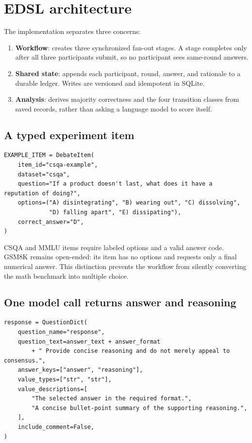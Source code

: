\documentclass[10pt]{article}
\begin{document}
\section{EDSL architecture}

The implementation separates three concerns:

\begin{enumerate}
  \item \textbf{Workflow}: creates three synchronized fan-out stages. A stage completes only after
  all three participants submit, so no participant sees same-round answers.
  \item \textbf{Shared state}: appends each participant, round, answer, and rationale to a durable
  ledger. Writes are versioned and idempotent in SQLite.
  \item \textbf{Analysis}: derives majority correctness and the four transition classes from saved
  records, rather than asking a language model to score itself.
\end{enumerate}

\subsection{A typed experiment item}

\begin{lstlisting}[style=edsl]
EXAMPLE_ITEM = DebateItem(
    item_id="csqa-example",
    dataset="csqa",
    question="If a product doesn't last, what does it have a reputation of doing?",
    options=("A) disintegrating", "B) wearing out", "C) dissolving",
             "D) falling apart", "E) dissipating"),
    correct_answer="D",
)
\end{lstlisting}

CSQA and MMLU items require labeled options and a valid answer code. GSM8K remains open-ended:
its item has no options and requests only a final numerical answer. This distinction prevents the
workflow from silently converting the math benchmark into multiple choice.

\subsection{One model call returns answer and reasoning}

\begin{lstlisting}[style=edsl]
response = QuestionDict(
    question_name="response",
    question_text=answer_text + answer_format
        + " Provide concise reasoning and do not merely appeal to consensus.",
    answer_keys=["answer", "reasoning"],
    value_types=["str", "str"],
    value_descriptions=[
        "The selected answer in the required format.",
        "A concise bullet-point summary of the supporting reasoning.",
    ],
    include_comment=False,
)
\end{lstlisting}
\end{document}
